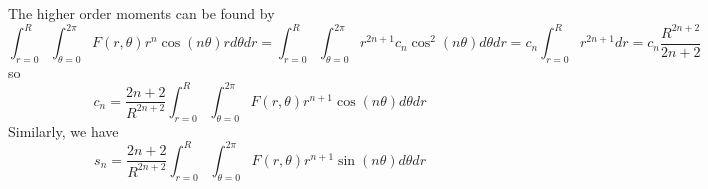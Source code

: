 \documentclass[twoside]{article}
\begin{document}
The higher order moments can be found by
\begin{equation}
\int^{R}_{r = 0}  \int^{2\pi}_{\theta = 0} F(r,\theta) r^n \cos(n\theta) r d\theta dr=   
\int^{R}_{r = 0}  \int^{2\pi}_{\theta = 0} r^{2n + 1}  c_n \cos^2(n\theta) d\theta dr =   
c_n  \int^{R}_{r = 0}   r^{2n + 1}   dr =  
c_n \frac{R^{2n+2}}{2n + 2} 
\end{equation}
so 
\begin{equation}
\boxed{
c_n = \frac{2n + 2}{R^{2n+2}} \int^{R}_{r = 0}  \int^{2\pi}_{\theta = 0} F(r,\theta) r^{n+1} \cos(n\theta) d\theta dr
}
\end{equation}
Similarly, we have
\begin{equation}
\boxed{
s_n = \frac{2n + 2}{R^{2n+2}} \int^{R}_{r = 0}  \int^{2\pi}_{\theta = 0} F(r,\theta) r^{n+1} \sin(n\theta) d\theta dr
}
\end{equation}
\end{document}
